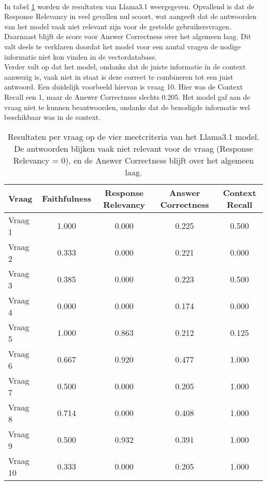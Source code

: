 \\[1em]
In tabel \ref{tab:resultaten_vragen_llama3.1} worden de resultaten van Llama3.1 weergegeven. Opvallend is dat de Response Relevancy in veel gevallen nul scoort, wat aangeeft dat de antwoorden van het model vaak niet relevant zijn voor de gestelde gebruikersvragen. Daarnaast blijft de score voor Answer Correctness over het algemeen laag. Dit valt deels te verklaren doordat het model voor een aantal vragen de nodige informatie niet kon vinden in de vectordatabase.
\\[1em]
Verder valt op dat het model, ondanks dat de juiste informatie in de context aanwezig is, vaak niet in staat is deze correct te combineren tot een juist antwoord. Een duidelijk voorbeeld hiervan is vraag 10. Hier was de Context Recall een 1, maar de Answer Correctness slechts 0.205. Het model gaf aan de vraag niet te kunnen beantwoorden, ondanks dat de benodigde informatie wel beschikbaar was in de context.

\begin{table}[H]
    \begin{tabular}{|l|c|c|c|c|}
        \hline
        \textbf{Vraag} & \textbf{Faithfulness} & \textbf{Response Relevancy} & \textbf{Answer Correctness} & \textbf{Context Recall} \\
        \hline
        Vraag 1 & 1.000 & 0.000 & 0.225 & 0.500 \\
        Vraag 2 & 0.333 & 0.000 & 0.221 & 0.000 \\
        Vraag 3 & 0.385 & 0.000 & 0.223 & 0.500 \\
        Vraag 4 & 0.000 & 0.000 & 0.174 & 0.000 \\
        Vraag 5 & 1.000 & 0.863 & 0.212 & 0.125 \\
        Vraag 6 & 0.667 & 0.920 & 0.477 & 1.000 \\
        Vraag 7 & 0.500 & 0.000 & 0.205 & 1.000 \\
        Vraag 8 & 0.714 & 0.000 & 0.408 & 1.000 \\
        Vraag 9 & 0.500 & 0.932 & 0.391 & 1.000 \\
        Vraag 10 & 0.333 & 0.000 & 0.205 & 1.000 \\
        \hline
    \end{tabular}
    \caption{Resultaten per vraag op de vier meetcriteria van het Llama3.1 model. De antwoorden blijken vaak niet relevant voor de vraag (Response Relevancy = 0), en de Answer Correctness blijft over het algemeen laag.}
    \label{tab:resultaten_vragen_llama3.1}
\end{table}

